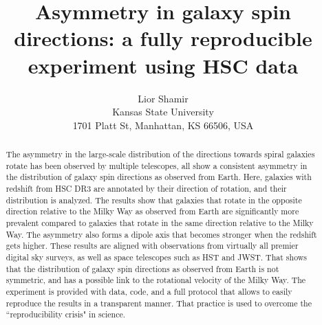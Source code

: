 \documentclass[final,5p,times,twocolumn]{article}
\begin{document}
\title{Asymmetry in galaxy spin directions: a fully reproducible experiment using HSC data}   %

\author{Lior Shamir \\ Kansas State University \\ 1701 Platt St, Manhattan, KS 66506, USA}

\date{}
\maketitle






\begin{abstract}
The asymmetry in the large-scale distribution of the directions towards spiral galaxies rotate has been observed by multiple telescopes, all show a consistent asymmetry in the distribution of galaxy spin directions as observed from Earth. Here, galaxies with redshift from HSC DR3 are annotated by their direction of rotation, and their distribution is analyzed. The results show that galaxies that rotate in the opposite direction relative to the Milky Way as observed from Earth are significantly more prevalent compared to galaxies that rotate in the same direction relative to the Milky Way. The asymmetry also forms a dipole axis that becomes stronger when the redshift gets higher. These results are aligned with observations from virtually all premier digital sky surveys, as well as space telescopes such as HST and JWST. That shows that the distribution of galaxy spin directions as observed from Earth is not symmetric, and has a possible link to the rotational velocity of the Milky Way. The experiment is provided with data, code, and a full protocol that allows to easily reproduce the results in a transparent manner. That practice is used to overcome the ``reproducibility crisis" in science. %
\end{abstract}
\end{document}
